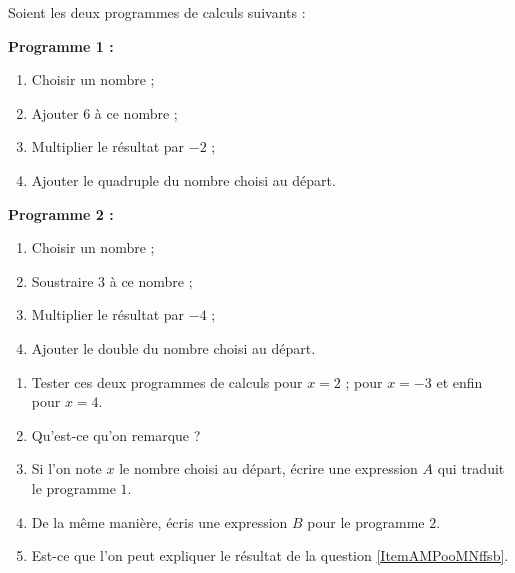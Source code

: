
\begin{exercice}\label{exosmath-0807}

Soient les deux programmes de calculs suivants :

\begin{framed}
    {\bf Programme 1 :}
\begin{enumerate}
    \item
 Choisir un nombre ;
\item
 Ajouter $6$ à ce nombre ;
\item
 Multiplier le résultat par $-2$ ;
\item
 Ajouter le quadruple du nombre choisi au départ.
\end{enumerate}
\end{framed}
\begin{framed}
    {\bf Programme 2 :}
\begin{enumerate}
    \item
 Choisir un nombre ;
    \item
 Soustraire $3$ à ce nombre ;
    \item
 Multiplier le résultat par $-4$ ;
    \item
 Ajouter le double du nombre choisi au départ.
\end{enumerate}
\end{framed}

\begin{enumerate}
    \item
 Tester ces deux programmes de calculs pour $x = 2$ ; pour $x = -3$ et enfin pour $x = 4$.
\item   \label{ItemAMPooMNffsb}
    Qu'est-ce qu'on remarque ?
\item
 Si l'on note $x$ le nombre choisi au départ, écrire une expression $A$ qui traduit le programme $1$.
\item
 De la même manière, écris une expression $B$ pour le programme $2$.
\item
    Est-ce que l'on peut expliquer le résultat de la question \ref{ItemAMPooMNffsb}.
\end{enumerate}

\end{exercice}
